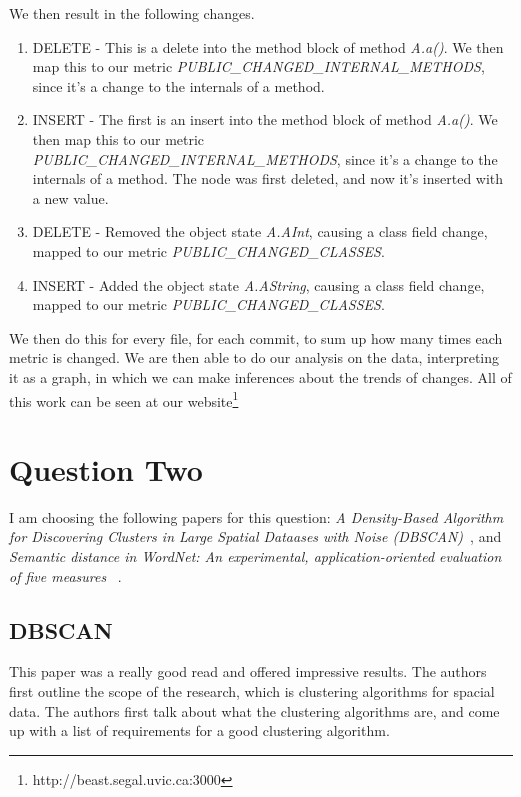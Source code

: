 \documentclass{article}
\numberwithin{equation}{section} %
\numberwithin{figure}{section} %
\numberwithin{table}{section} %
\begin{document}
We then result in the following changes. 
\begin{enumerate}
  \item DELETE - This is a delete into the method block of method \textit{A.a()}.  We then map this to our metric \textit{PUBLIC\_CHANGED\_INTERNAL\_METHODS}, since it's a change to the internals of a method.
  \item INSERT - The first is an insert into the method block of method \textit{A.a()}.  We then map this to our metric \textit{PUBLIC\_CHANGED\_INTERNAL\_METHODS}, since it's a change to the internals of a method.  The node was first deleted, and now it's inserted with a new value.
  \item DELETE - Removed the object state \textit{A.AInt}, causing a class field change, mapped to our metric \textit {PUBLIC\_CHANGED\_CLASSES}.
  \item INSERT - Added the object state \textit{A.AString}, causing a class field change, mapped to our metric \textit {PUBLIC\_CHANGED\_CLASSES}.
\end{enumerate}

We then do this for every file, for each commit, to sum up how many times each metric is changed.  We are then able to do our analysis on the data, interpreting it as a graph, in which we can make inferences about the trends of changes.  All of this work can be seen at our website\footnote{http://beast.segal.uvic.ca:3000}  


\section{Question Two}
\label{sec:q2}
I am choosing the following papers for this question: \textit{A Density-Based Algorithm for Discovering Clusters in Large Spatial Dataases with Noise (DBSCAN)}~\cite{Ester96adensity-based}, and \textit{Semantic distance in WordNet: An experimental, application-oriented evaluation of five measures} ~\cite{Budanitsky01semanticdistance}.  

\subsection{DBSCAN}
This paper was a really good read and offered impressive results.  The authors first outline the scope of the research, which is clustering algorithms for spacial data. The authors first talk about what the clustering algorithms are, and come up with a list of requirements for a good clustering algorithm.  
\end{document}
